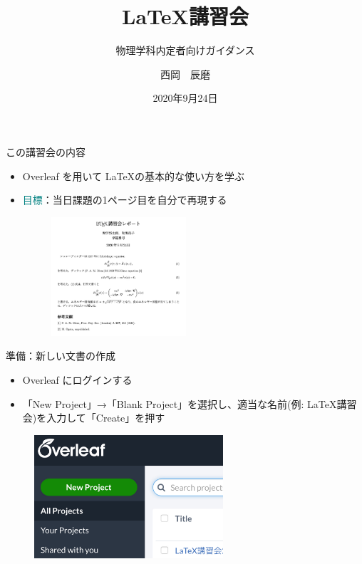 \documentclass[dvipdfmx]{beamer}
\title{\LaTeX 講習会}
\author{西岡　辰磨}
\date{2020年9月24日}
\subtitle{物理学科内定者向けガイダンス}
\begin{document}
\begin{frame}
\titlepage
\end{frame}

\begin{frame}{この講習会の内容}
\begin{itemize}
    \item Overleaf を用いて \LaTeX の基本的な使い方を学ぶ
    
    \bigskip
    \item \textcolor{teal}{目標}：当日課題の1ページ目を自分で再現する
    \begin{figure}
        \centering
        \includegraphics[width=5cm]{fig_kadai.pdf}
    \end{figure}
\end{itemize}
\end{frame}

\begin{frame}[fragile]{準備：新しい文書の作成}
\begin{itemize}
    \item Overleaf にログインする
    \item 「New Project」→「Blank Project」を選択し、適当な名前(例: LaTeX講習会)を入力して「Create」を押す
\end{itemize}
\begin{figure}
    \centering
    \includegraphics[width=7cm,pagebox=cropbox,clip]{NewDocument}
\end{figure}
\end{frame}
\end{document}
